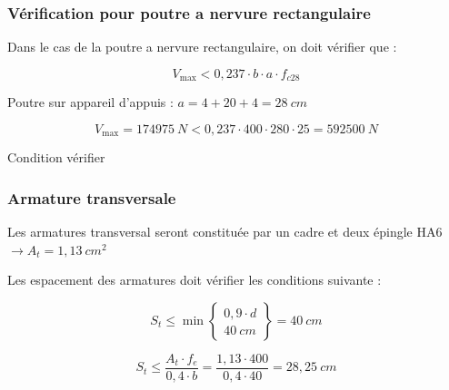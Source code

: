 \documentclass[12pt,a4paper]{article}
\begin{document}
	
	
	\subsubsection{Vérification pour poutre a nervure rectangulaire}
	
	Dans le cas de la poutre a nervure rectangulaire, on doit vérifier que :
	
	\[ V_{\max} < 0,237 \cdot b \cdot a \cdot f_{c28} \]
	
	Poutre sur appareil d'appuis : $a = 4 + 20 + 4 = 28 ~\unit{cm}$
	
	\begin{center}
	\end{center}
	
	
	\[ V_{\max} = 174975 ~\unit{N} < 0,237 \cdot 400 \cdot 280 \cdot 25 = 592500 ~\unit{N} \]
	
	{\centering Condition vérifier\par}
	
	
	\subsubsection{Armature transversale}
	
	Les armatures transversal seront constituée par un cadre et deux épingle HA6 $\rightarrow A_{t} = 1,13 ~\unit{cm^{2}}$
	
	Les espacement des armatures doit vérifier les conditions suivante : 
	
	\[ S_{t} \leq \min \left.\begin{cases}
		0,9 \cdot d \\
		40 ~\unit{cm}
	\end{cases}\right\}  = 40 ~\unit{cm} \]

	\[ S_{t} \leq \dfrac{A_{t} \cdot f_{e}}{0,4 \cdot b} = \dfrac{1,13 \cdot 400}{0,4 \cdot 40} = 28,25 ~\unit{cm} \]
	
\end{document}
